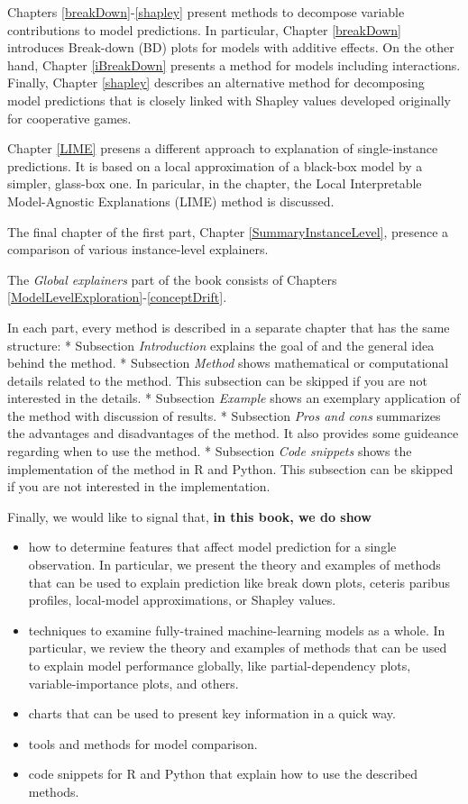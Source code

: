 \documentclass[12pt,]{krantz}
\providecommand{\tightlist}{%
  \setlength{\itemsep}{0pt}\setlength{\parskip}{0pt}}
\theoremstyle{definition}
\theoremstyle{definition}
\theoremstyle{definition}
\theoremstyle{remark}
\begin{document}
Chapters \ref{breakDown}-\ref{shapley} present methods to decompose
variable contributions to model predictions. In particular, Chapter
\ref{breakDown} introduces Break-down (BD) plots for models with
additive effects. On the other hand, Chapter \ref{iBreakDown} presents a
method for models including interactions. Finally, Chapter \ref{shapley}
describes an alternative method for decomposing model predictions that
is closely linked with Shapley values \citep{shapleybook1952} developed
originally for cooperative games.

Chapter \ref{LIME} presens a different approach to explanation of
single-instance predictions. It is based on a local approximation of a
black-box model by a simpler, glass-box one. In paricular, in the
chapter, the Local Interpretable Model-Agnostic Explanations (LIME)
method \citep{lime} is discussed.

The final chapter of the first part, Chapter \ref{SummaryInstanceLevel},
presence a comparison of various instance-level explainers.

The \emph{Global explainers} part of the book consists of Chapters
\ref{ModelLevelExploration}-\ref{conceptDrift}.

In each part, every method is described in a separate chapter that has
the same structure: * Subsection \emph{Introduction} explains the goal
of and the general idea behind the method. * Subsection \emph{Method}
shows mathematical or computational details related to the method. This
subsection can be skipped if you are not interested in the details. *
Subsection \emph{Example} shows an exemplary application of the method
with discussion of results. * Subsection \emph{Pros and cons} summarizes
the advantages and disadvantages of the method. It also provides some
guideance regarding when to use the method. * Subsection \emph{Code
snippets} shows the implementation of the method in R and Python. This
subsection can be skipped if you are not interested in the
implementation.

Finally, we would like to signal that, \textbf{in this book, we do show}

\begin{itemize}
\tightlist
\item
  how to determine features that affect model prediction for a single
  observation. In particular, we present the theory and examples of
  methods that can be used to explain prediction like break down plots,
  ceteris paribus profiles, local-model approximations, or Shapley
  values.
\item
  techniques to examine fully-trained machine-learning models as a
  whole. In particular, we review the theory and examples of methods
  that can be used to explain model performance globally, like
  partial-dependency plots, variable-importance plots, and others.
\item
  charts that can be used to present key information in a quick way.
\item
  tools and methods for model comparison.
\item
  code snippets for R and Python that explain how to use the described
  methods.
\end{itemize}
\end{document}
